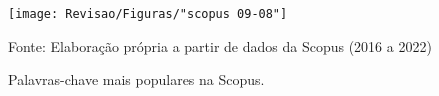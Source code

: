 \begin{figure}[H]
	\centering
	\caption{Palavras-chave mais populares na Scopus.}
	\label{fig:scopus-09-08}
	\texttt{[image: Revisao/Figuras/"scopus 09-08"]}
	
	\vspace{0.2cm}
	Fonte: Elaboração própria a partir de dados da Scopus (2016 a 2022)
\end{figure}